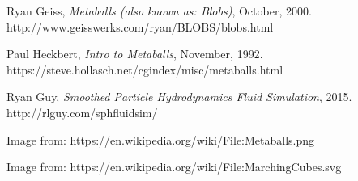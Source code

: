 \documentclass{article}
\begin{document}
\begin{thebibliography}{9}

  Ryan Geiss,
  \textit{Metaballs (also known as: Blobs)},
  October,
  2000.
  \\
  http://www.geisswerks.com/ryan/BLOBS/blobs.html

  Paul Heckbert,
  \textit{Intro to Metaballs},
  November,
  1992.
  \\
  https://steve.hollasch.net/cgindex/misc/metaballs.html


  Ryan Guy,
  \textit{Smoothed Particle Hydrodynamics Fluid Simulation},
  2015.
  \\
  http://rlguy.com/sphfluidsim/

  Image from: https://en.wikipedia.org/wiki/File:Metaballs.png

  Image from: https://en.wikipedia.org/wiki/File:MarchingCubes.svg

\end{thebibliography}
\end{document}

